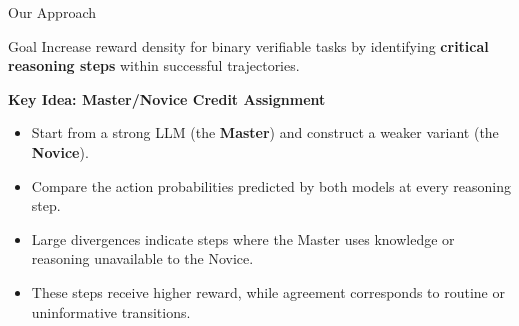 \documentclass[
  english,            %
  aspectratio=169,    %
]{tumbeamer}
\begin{document}
\begin{frame}{Our Approach}

\begin{block}{Goal}
Increase reward density for binary verifiable tasks by identifying
\textbf{critical reasoning steps} within successful trajectories.
\end{block}

\vspace{3mm}

\textbf{Key Idea: Master/Novice Credit Assignment}

\vspace{1mm}

\begin{itemize}
    \item Start from a strong LLM (the \textbf{Master}) and construct a weaker variant (the \textbf{Novice}).
    \item Compare the action probabilities predicted by both models at every reasoning step.
    \item Large divergences indicate steps where the Master uses knowledge or reasoning unavailable to the Novice.
    \item These steps receive higher reward, while agreement corresponds to routine or uninformative transitions.
\end{itemize}

\end{frame}
\end{document}

